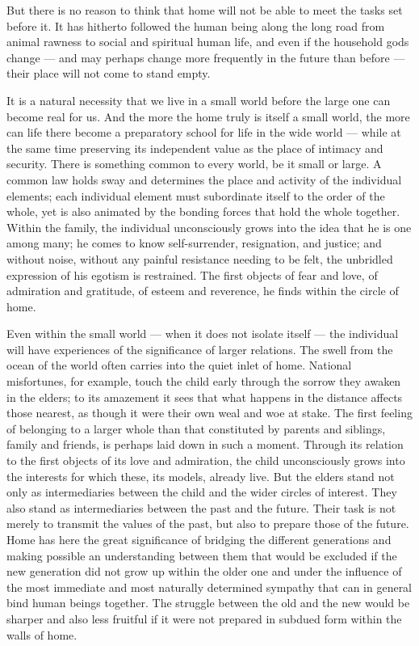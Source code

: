 \documentclass[12pt,a4paper]{article}
\newcommand{\opage}[1]{\marginnote{\footnotesize\textit{[#1]}}}
\begin{document}
But there is no reason to think that home will not be able to meet
the tasks set before it. It has hitherto followed the human being
along the long road from animal rawness to social and spiritual human
life, and even if the household gods change --- and may perhaps \opage{11}change
more frequently in the future than before --- their place will not come
to stand empty.

It is a natural necessity that we live in a small world before the
large one can become real for us. And the more the home truly is
itself a small world, the more can life there become a preparatory
school for life in the wide world --- while at the same time
preserving its independent value as the place of intimacy and
security. There is something common to every world, be it small or
large. A common law holds sway and determines the place and activity
of the individual elements; each individual element must subordinate
itself to the order of the whole, yet is also animated by the bonding
forces that hold the whole together. Within the family, the individual
unconsciously grows into the idea that he is one among many; he comes
to know self-surrender, resignation, and justice; and without noise,
without any painful resistance needing to be felt, the unbridled
expression of his egotism is restrained. The first objects of fear and
love, of admiration and gratitude, of esteem and reverence, he finds
within the circle of home.

Even within the small world --- when it does not isolate itself ---
the individual will have experiences of the significance of larger
relations. The swell from the ocean of the world often carries into
the quiet inlet of home. National misfortunes, for example, touch
the child early through the sorrow they awaken in the elders; to its
amazement it sees that what happens in the distance affects those
nearest, as though it were their own weal and woe at stake. The first
feeling of belonging to a larger whole than that constituted by
parents and siblings, family and friends, is perhaps laid down in
such a moment. Through its relation to the first objects of its love
and admiration, the child unconsciously grows into the interests for
which these, its models, already live. But the elders stand not only
as intermediaries between the child and the wider circles of interest.
They also stand as intermediaries between the past and the future.
Their task is not merely to transmit the values of the past, but also
to prepare those of the future. Home has here the great significance
of bridging the different generations and making possible an
understanding between them that would be excluded if the new
generation did not grow up within the older one and under the
influence of the most immediate and most naturally determined
sympathy that can in general bind human beings together. The
struggle between the old and the new would be sharper and also less
fruitful if it were not prepared in subdued form within the walls of
home.
\end{document}
